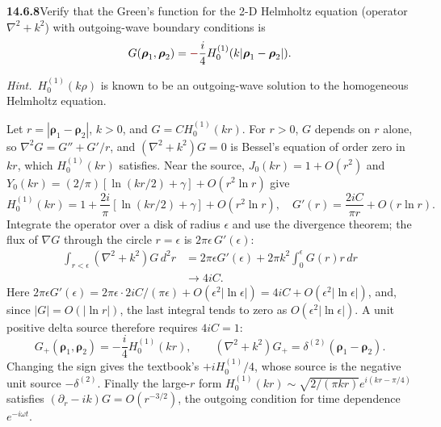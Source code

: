 \par\bigskip
\noindent\textbf{14.6.8}\quad Verify that the Green's function for the
2-D Helmholtz equation (operator $\nabla^{2}+k^{2}$) with
outgoing-wave boundary conditions is
\[
G(\boldsymbol{\rho}_{1},\boldsymbol{\rho}_{2})
=\erratum{-}\frac{i}{4}H_{0}^{(1)}(k|\boldsymbol{\rho}_{1}-\boldsymbol{\rho}_{2}|).
\]
\par\emph{Hint.}~$H_{0}^{(1)}(k\rho)$ is known to be an outgoing-wave
solution to the homogeneous Helmholtz equation.
\par{}
\solution
{}
Let $r=|\boldsymbol\rho_1-\boldsymbol\rho_2|$, $k>0$, and
$G=C H_0^{(1)}(kr)$. For $r>0$, $G$ depends on $r$ alone, so
$\nabla^2G=G''+G'/r$, and $(\nabla^2+k^2)G=0$ is Bessel's equation
of order zero in $kr$, which $H_0^{(1)}(kr)$ satisfies.
Near the source, $J_0(kr)=1+O(r^2)$ and
$Y_0(kr)=(2/\pi)[\ln(kr/2)+\gamma]+O(r^2\ln r)$ give
\[
H_0^{(1)}(kr)=1+\frac{2i}{\pi}
[\ln(kr/2)+\gamma]+O(r^2\ln r),
\quad G'(r)=\frac{2iC}{\pi r}+O(r\ln r).
\]
Integrate the operator over a disk of radius $\epsilon$ and use
the divergence theorem; the flux of $\nabla G$ through the circle
$r=\epsilon$ is $2\pi\epsilon\,G'(\epsilon)$:
\begin{align*}
\int_{r<\epsilon}(\nabla^2+k^2)G\,d^2r
&=2\pi\epsilon G'(\epsilon)
+2\pi k^2\int_0^\epsilon G(r)r\,dr\\
&\longrightarrow4iC.
\end{align*}
Here $2\pi\epsilon G'(\epsilon)=2\pi\epsilon\cdot2iC/(\pi\epsilon)
+O(\epsilon^2|\ln\epsilon|)=4iC+O(\epsilon^2|\ln\epsilon|)$, and,
since $|G|=O(|\ln r|)$, the last integral tends to zero as
$O(\epsilon^2|\ln\epsilon|)$.
A unit positive delta source therefore requires $4iC=1$:
\[
\boxed{G_+(\boldsymbol\rho_1,\boldsymbol\rho_2)
=-\frac i4H_0^{(1)}(kr),\qquad
(\nabla^2+k^2)G_+=\delta^{(2)}(\boldsymbol\rho_1-\boldsymbol\rho_2)}.
\]
Changing the sign gives the textbook's $+iH_0^{(1)}/4$, whose
source is the negative unit source $-\delta^{(2)}$. Finally the
large-$r$ form
$H_0^{(1)}(kr)\sim\sqrt{2/(\pi kr)}e^{i(kr-\pi/4)}$
satisfies $(\partial_r-ik)G=O(r^{-3/2})$, the outgoing condition
for time dependence $e^{-i\omega t}$.

